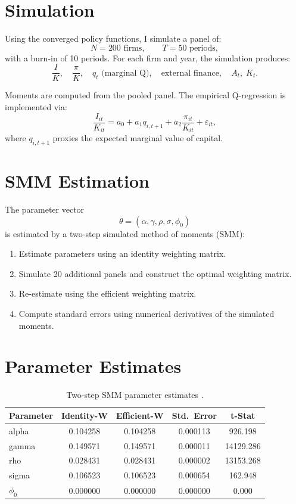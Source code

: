 \documentclass[12pt]{article}
\begin{document}
\section{Simulation}

Using the converged policy functions, I simulate a panel of:
\[
N = 200 \text{ firms}, \qquad T = 50 \text{ periods},
\]
with a burn-in of 10 periods. For each firm and year, the simulation produces:
\[
\frac{I}{K}, \quad \frac{\pi}{K}, \quad q_t \text{ (marginal Q)}, 
\quad \text{external finance}, \quad A_t,\; K_t.
\]

Moments are computed from the pooled panel.  
The empirical Q-regression is implemented via:
\[
\frac{I_{it}}{K_{it}} = a_0 + a_1 q_{i,t+1} + a_2 \frac{\pi_{it}}{K_{it}} + \varepsilon_{it},
\]
where $q_{i,t+1}$ proxies the expected marginal value of capital.

\section{SMM Estimation}

The parameter vector
\[
\theta = (\alpha, \gamma, \rho, \sigma, \phi_0)
\]
is estimated by a two-step simulated method of moments (SMM):

\begin{enumerate}
\item Estimate parameters using an identity weighting matrix.
\item Simulate 20 additional panels and construct the optimal weighting matrix.
\item Re-estimate using the efficient weighting matrix.
\item Compute standard errors using numerical derivatives of the simulated moments.
\end{enumerate}
\newpage
\section{Parameter Estimates}

\begin{table}[h!]
\centering
\begin{tabular}{lcccc}
\toprule
Parameter & Identity-W & Efficient-W & Std.\ Error & t-Stat \\
\midrule
alpha & 0.104258 & 0.104258 & 0.000113 & 926.198 \\
gamma & 0.149571 & 0.149571 & 0.000011 & 14129.286 \\
rho   & 0.028431 & 0.028431 & 0.000002 & 13153.268 \\
sigma & 0.106523 & 0.106523 & 0.000654 & 162.948 \\
\(\phi_0\)  & 0.000000 & 0.000000 & 0.000000 & 0.000 \\
\bottomrule
\end{tabular}
\caption{Two-step SMM parameter estimates .}
\end{table}
\end{document}
